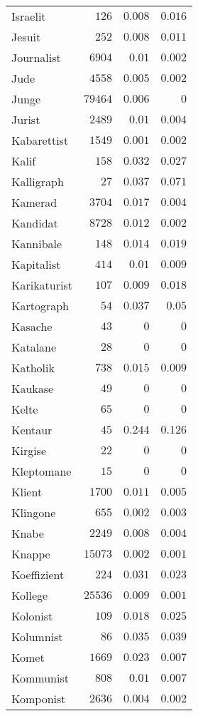 \begin{supertabular}{lrrr}
Israelit & $126$ & $0.008$ & $0.016$ \\
Jesuit & $252$ & $0.008$ & $0.011$ \\
Journalist & $6904$ & $0.01$ & $0.002$ \\
Jude & $4558$ & $0.005$ & $0.002$ \\
Junge & $79464$ & $0.006$ & $0$ \\
Jurist & $2489$ & $0.01$ & $0.004$ \\
Kabarettist & $1549$ & $0.001$ & $0.002$ \\
Kalif & $158$ & $0.032$ & $0.027$ \\
Kalligraph & $27$ & $0.037$ & $0.071$ \\
Kamerad & $3704$ & $0.017$ & $0.004$ \\
Kandidat & $8728$ & $0.012$ & $0.002$ \\
Kannibale & $148$ & $0.014$ & $0.019$ \\
Kapitalist & $414$ & $0.01$ & $0.009$ \\
Karikaturist & $107$ & $0.009$ & $0.018$ \\
Kartograph & $54$ & $0.037$ & $0.05$ \\
Kasache & $43$ & $0$ & $0$ \\
Katalane & $28$ & $0$ & $0$ \\
Katholik & $738$ & $0.015$ & $0.009$ \\
Kaukase & $49$ & $0$ & $0$ \\
Kelte & $65$ & $0$ & $0$ \\
Kentaur & $45$ & $0.244$ & $0.126$ \\
Kirgise & $22$ & $0$ & $0$ \\
Kleptomane & $15$ & $0$ & $0$ \\
Klient & $1700$ & $0.011$ & $0.005$ \\
Klingone & $655$ & $0.002$ & $0.003$ \\
Knabe & $2249$ & $0.008$ & $0.004$ \\
Knappe & $15073$ & $0.002$ & $0.001$ \\
Koeffizient & $224$ & $0.031$ & $0.023$ \\
Kollege & $25536$ & $0.009$ & $0.001$ \\
Kolonist & $109$ & $0.018$ & $0.025$ \\
Kolumnist & $86$ & $0.035$ & $0.039$ \\
Komet & $1669$ & $0.023$ & $0.007$ \\
Kommunist & $808$ & $0.01$ & $0.007$ \\
Komponist & $2636$ & $0.004$ & $0.002$ \\

\end{supertabular}
